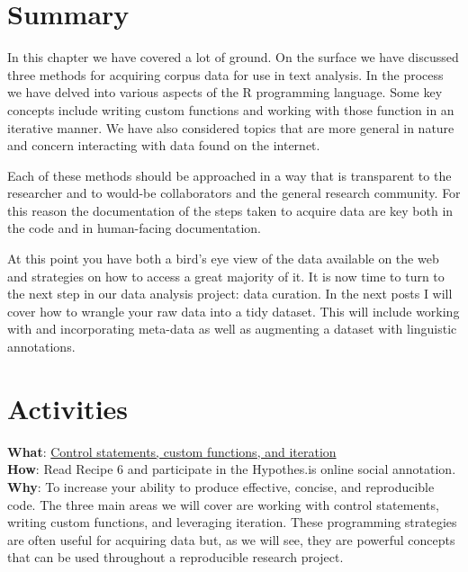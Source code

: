 \documentclass[
  letterpaper,
]{latex/krantz}
\begin{document}
\hypertarget{summary-5}{%
\section*{Summary}\label{summary-5}}


In this chapter we have covered a lot of ground. On the surface we have
discussed three methods for acquiring corpus data for use in text
analysis. In the process we have delved into various aspects of the R
programming language. Some key concepts include writing custom functions
and working with those function in an iterative manner. We have also
considered topics that are more general in nature and concern
interacting with data found on the internet.

Each of these methods should be approached in a way that is transparent
to the researcher and to would-be collaborators and the general research
community. For this reason the documentation of the steps taken to
acquire data are key both in the code and in human-facing documentation.

At this point you have both a bird's eye view of the data available on
the web and strategies on how to access a great majority of it. It is
now time to turn to the next step in our data analysis project: data
curation. In the next posts I will cover how to wrangle your raw data
into a tidy dataset. This will include working with and incorporating
meta-data as well as augmenting a dataset with linguistic annotations.

\hypertarget{activities-4}{%
\section*{Activities}\label{activities-4}}


\begin{tcolorbox}[enhanced jigsaw, toprule=.15mm, bottomtitle=1mm, coltitle=black, title=\textcolor{quarto-callout-tip-color}{\faLightbulb}\hspace{0.5em}{Recipe}, left=2mm, colframe=quarto-callout-tip-color-frame, bottomrule=.15mm, colbacktitle=quarto-callout-tip-color!10!white, leftrule=.75mm, colback=white, titlerule=0mm, breakable, toptitle=1mm, opacityback=0, arc=.35mm, rightrule=.15mm, opacitybacktitle=0.6]

\textbf{What}:
\href{https://lin380.github.io/tadr/articles/recipe_6.html}{Control
statements, custom functions, and iteration}\\
\textbf{How}: Read Recipe 6 and participate in the Hypothes.is online
social annotation.\\
\textbf{Why}: To increase your ability to produce effective, concise,
and reproducible code. The three main areas we will cover are working
with control statements, writing custom functions, and leveraging
iteration. These programming strategies are often useful for acquiring
data but, as we will see, they are powerful concepts that can be used
throughout a reproducible research project.

\end{tcolorbox}
\end{document}
